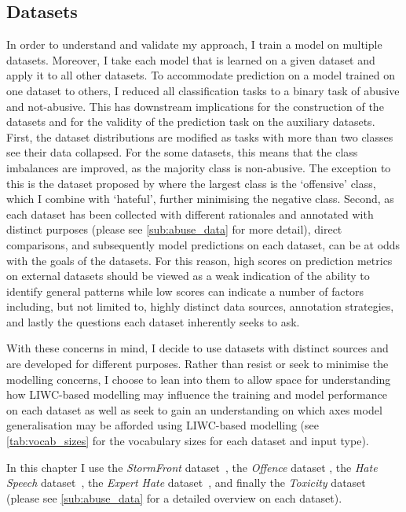 \subsection{Datasets}
In order to understand and validate my approach, I train a model on multiple datasets. Moreover, I take each model that is learned on a given dataset and apply it to all other datasets. To accommodate prediction on a model trained on one dataset to others, I reduced all classification tasks to a binary task of abusive and not-abusive. This has downstream implications for the construction of the datasets and for the validity of the prediction task on the auxiliary datasets.
First, the dataset distributions are modified as tasks with more than two classes see their data collapsed. For the some datasets, this means that the class imbalances are improved, as the majority class is non-abusive. The exception to this is the dataset proposed by \citet{Davidson:2017} where the largest class is the `offensive' class, which I combine with `hateful', further minimising the negative class.
Second, as each dataset has been collected with different rationales and annotated with distinct purposes (please see \cref{sub:abuse_data} for more detail), direct comparisons, and subsequently model predictions on each dataset, can be at odds with the goals of the datasets. For this reason, high scores on prediction metrics on external datasets should be viewed as a weak indication of the ability to identify general patterns while low scores can indicate a number of factors including, but not limited to, highly distinct data sources, annotation strategies, and lastly the questions each dataset inherently seeks to ask.

With these concerns in mind, I decide to use datasets with distinct sources and are developed for different purposes. Rather than resist or seek to minimise the modelling concerns, I choose to lean into them to allow space for understanding how LIWC-based modelling may influence the training and model performance on each dataset as well as seek to gain an understanding on which axes model generalisation may be afforded using LIWC-based modelling (see \cref{tab:vocab_sizes} for the vocabulary sizes for each dataset and input type).

In this chapter I use the \textit{StormFront} dataset~\citep{Garcia:2019}, the \textit{Offence} dataset \citep{Davidson:2017}, the \textit{Hate Speech} dataset~\citep{Waseem-Hovy:2016}, the \textit{Expert Hate} dataset~\citep{Waseem:2016}, and finally the \textit{Toxicity} dataset~\citep{Wulczyn:2017} (please see \cref{sub:abuse_data} for a detailed overview on each dataset).

